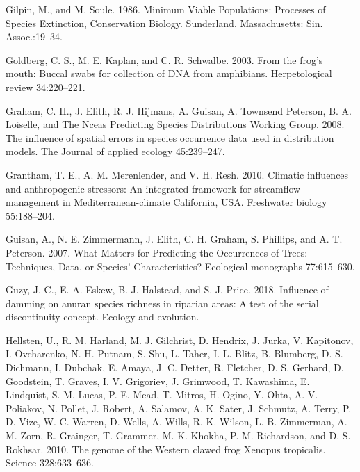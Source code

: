 \documentclass[proquest,12pt,final]{ucthesis-CA2012} %
\begin{document}
\begin{ucmainmatter}
\leavevmode\hypertarget{ref-gilpin_minimum_1986}{}%
Gilpin, M., and M. Soule. 1986. Minimum Viable Populations: Processes of
Species Extinction, Conservation Biology. Sunderland, Massachusetts:
Sin. Assoc.:19--34.

\leavevmode\hypertarget{ref-goldberg_frogs_2003}{}%
Goldberg, C. S., M. E. Kaplan, and C. R. Schwalbe. 2003. From the frog's
mouth: Buccal swabs for collection of DNA from amphibians.
Herpetological review 34:220--221.

\leavevmode\hypertarget{ref-graham_influence_2008}{}%
Graham, C. H., J. Elith, R. J. Hijmans, A. Guisan, A. Townsend Peterson,
B. A. Loiselle, and The Nceas Predicting Species Distributions Working
Group. 2008. The influence of spatial errors in species occurrence data
used in distribution models. The Journal of applied ecology 45:239--247.

\leavevmode\hypertarget{ref-grantham_climatic_2010}{}%
Grantham, T. E., A. M. Merenlender, and V. H. Resh. 2010. Climatic
influences and anthropogenic stressors: An integrated framework for
streamflow management in Mediterranean-climate California, USA.
Freshwater biology 55:188--204.

\leavevmode\hypertarget{ref-guisan_what_2007}{}%
Guisan, A., N. E. Zimmermann, J. Elith, C. H. Graham, S. Phillips, and
A. T. Peterson. 2007. What Matters for Predicting the Occurrences of
Trees: Techniques, Data, or Species' Characteristics? Ecological
monographs 77:615--630.

\leavevmode\hypertarget{ref-guzy_influence_2018}{}%
Guzy, J. C., E. A. Eskew, B. J. Halstead, and S. J. Price. 2018.
Influence of damming on anuran species richness in riparian areas: A
test of the serial discontinuity concept. Ecology and evolution.

\leavevmode\hypertarget{ref-hellsten_genome_2010}{}%
Hellsten, U., R. M. Harland, M. J. Gilchrist, D. Hendrix, J. Jurka, V.
Kapitonov, I. Ovcharenko, N. H. Putnam, S. Shu, L. Taher, I. L. Blitz,
B. Blumberg, D. S. Dichmann, I. Dubchak, E. Amaya, J. C. Detter, R.
Fletcher, D. S. Gerhard, D. Goodstein, T. Graves, I. V. Grigoriev, J.
Grimwood, T. Kawashima, E. Lindquist, S. M. Lucas, P. E. Mead, T.
Mitros, H. Ogino, Y. Ohta, A. V. Poliakov, N. Pollet, J. Robert, A.
Salamov, A. K. Sater, J. Schmutz, A. Terry, P. D. Vize, W. C. Warren, D.
Wells, A. Wills, R. K. Wilson, L. B. Zimmerman, A. M. Zorn, R. Grainger,
T. Grammer, M. K. Khokha, P. M. Richardson, and D. S. Rokhsar. 2010. The
genome of the Western clawed frog Xenopus tropicalis. Science
328:633--636.


\end{ucmainmatter}
\end{document}
